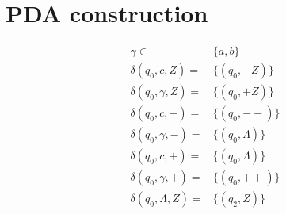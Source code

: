 \documentclass{article}
\begin{document}
\section{PDA construction}
\begin{align*}
\gamma \in& \{a, b\}\\
\delta(q_0, c, Z) =& \{(q_0, -Z)\}\\
\delta(q_0, \gamma, Z) =& \{(q_0, +Z)\}\\
\delta(q_0, c, -) =& \{(q_0, --)\}\\
\delta(q_0, \gamma, -) =& \{(q_0, \Lambda)\}\\
\delta(q_0, c, +) =& \{(q_0, \Lambda)\}\\
\delta(q_0, \gamma, +) =& \{(q_0, ++)\}\\
\delta(q_0, \Lambda, Z) =& \{(q_2, Z)\}
\end{align*}
\end{document}
